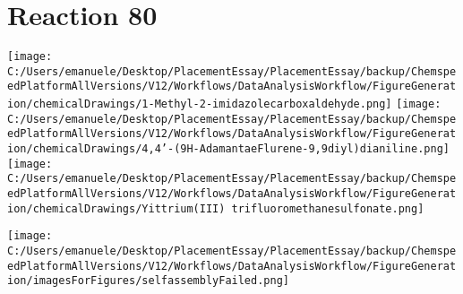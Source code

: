 \documentclass{article}%
\begin{document}
\section*{Reaction 80}%
%
\begin{scheme}[H]%
\begin{minipage}{0.5\textwidth}%
\texttt{[image: C:/Users/emanuele/Desktop/PlacementEssay/PlacementEssay/backup/ChemspeedPlatformAllVersions/V12/Workflows/DataAnalysisWorkflow/FigureGeneration/chemicalDrawings/1-Methyl-2-imidazolecarboxaldehyde.png]}%
\texttt{[image: C:/Users/emanuele/Desktop/PlacementEssay/PlacementEssay/backup/ChemspeedPlatformAllVersions/V12/Workflows/DataAnalysisWorkflow/FigureGeneration/chemicalDrawings/4,4'-(9H-AdamantaeFlurene-9,9diyl)dianiline.png]}%
\texttt{[image: C:/Users/emanuele/Desktop/PlacementEssay/PlacementEssay/backup/ChemspeedPlatformAllVersions/V12/Workflows/DataAnalysisWorkflow/FigureGeneration/chemicalDrawings/Yittrium(III) trifluoromethanesulfonate.png]}%
\end{minipage}%
\begin{minipage}{0.5\textwidth}%
\begin{center}%
\texttt{[image: C:/Users/emanuele/Desktop/PlacementEssay/PlacementEssay/backup/ChemspeedPlatformAllVersions/V12/Workflows/DataAnalysisWorkflow/FigureGeneration/imagesForFigures/selfassemblyFailed.png]}%
\end{center}%
\end{minipage}%
\caption{Self-assembly of components 12, 13, with Yittrium(III) in a 3.0:1.5:1.0 molar ratio in CH$_3$CN at 60\textdegree C for 40h. These are the reagents (starting materials) for reaction 80.}%
\end{scheme}%
\end{document}

